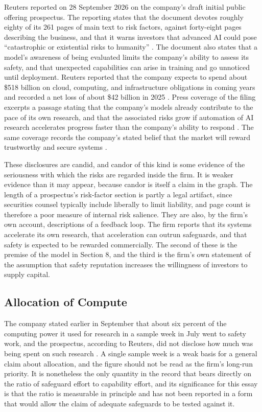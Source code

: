 \documentclass[12pt]{article}
\theoremstyle{definition}
\theoremstyle{remark}
\begin{document}
Reuters reported on 28 September 2026 on the company's draft initial public offering prospectus. The reporting states that the document devotes roughly eighty of its 261 pages of main text to risk factors, against forty-eight pages describing the business, and that it warns investors that advanced AI could pose ``catastrophic or existential risks to humanity'' \cite{reuters2026sep}. The document also states that a model's awareness of being evaluated limits the company's ability to assess its safety, and that unexpected capabilities can arise in training and go unnoticed until deployment. Reuters reported that the company expects to spend about \$518 billion on cloud, computing, and infrastructure obligations in coming years and recorded a net loss of about \$42 billion in 2025 \cite{reuters2026sep}. Press coverage of the filing excerpts a passage stating that the company's models already contribute to the pace of its own research, and that the associated risks grow if automation of AI research accelerates progress faster than the company's ability to respond \cite{pcworld2026}. The same coverage records the company's stated belief that the market will reward trustworthy and secure systems \cite{reuters2026sep}.

These disclosures are candid, and candor of this kind is some evidence of the seriousness with which the risks are regarded inside the firm. It is weaker evidence than it may appear, because candor is itself a claim in the graph. The length of a prospectus's risk-factor section is partly a legal artifact, since securities counsel typically include liberally to limit liability, and page count is therefore a poor measure of internal risk salience. They are also, by the firm's own account, descriptions of a feedback loop. The firm reports that its systems accelerate its own research, that acceleration can outrun safeguards, and that safety is expected to be rewarded commercially. The second of these is the premise of the model in Section 8, and the third is the firm's own statement of the assumption that safety reputation increases the willingness of investors to supply capital.

\subsection{Allocation of Compute}

The company stated earlier in September that about six percent of the computing power it used for research in a sample week in July went to safety work, and the prospectus, according to Reuters, did not disclose how much was being spent on such research \cite{reuters2026sep}. A single sample week is a weak basis for a general claim about allocation, and the figure should not be read as the firm's long-run priority. It is nonetheless the only quantity in the record that bears directly on the ratio of safeguard effort to capability effort, and its significance for this essay is that the ratio is measurable in principle and has not been reported in a form that would allow the claim of adequate safeguards to be tested against it.
\end{document}
